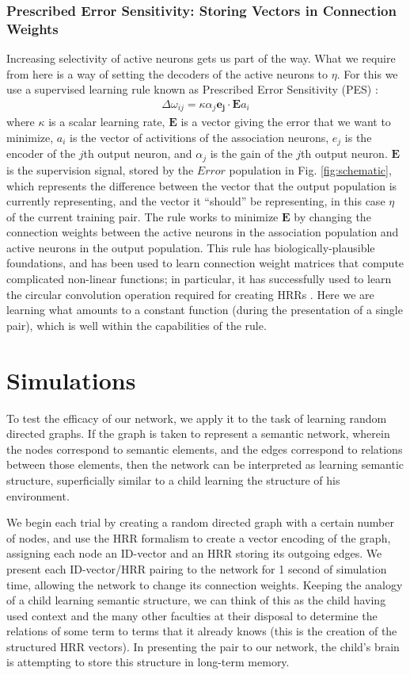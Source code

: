 \documentclass[10pt,letterpaper]{article}
\begin{document}
\subsubsection{Prescribed Error Sensitivity: Storing Vectors in Connection Weights}
Increasing selectivity of active neurons gets us part of the way. What we require from here is a way of setting the decoders of the active neurons to $\eta$. For this we use a supervised learning rule known as Prescribed Error Sensitivity (PES) \citep{MacNeil2011a}:
\begin{align}
\Delta \omega_{ij} = \kappa \alpha_j \mathbf{e_j} \cdot \mathbf{E}a_i
\end{align}
where $\kappa$ is a scalar learning rate, $\mathbf{E}$ is a vector giving the error that we want to minimize, $a_i$ is the vector of activitions of the association neurons, $e_j$ is the encoder of the $j$th output neuron, and $\alpha_j$ is the gain of the $j$th output neuron. $\mathbf{E}$ is the supervision signal, stored by the $Error$ population in Fig. \ref{fig:schematic}, which represents the difference between the vector that the output population is currently representing, and the vector it ``should'' be representing, in this case $\eta$ of the current training pair. The rule works to minimize $\mathbf{E}$ by changing the connection weights between the active neurons in the association population and active neurons in the output population. This rule has biologically-plausible foundations, and has been used to learn connection weight matrices that compute complicated non-linear functions; in particular, it has successfully used to learn the circular convolution operation required for creating HRRs \citep{Stewart2011a}. Here we are learning what amounts to a constant function (during the presentation of a single pair), which is well within the capabilities of the rule.

\section{Simulations}
To test the efficacy of our network, we apply it to the task of learning random directed graphs. If the graph is taken to represent a semantic network, wherein the nodes correspond to semantic elements, and the edges correspond to relations between those elements, then the network can be interpreted as learning semantic structure, superficially similar to a child learning the structure of his environment.

We begin each trial by creating a random directed graph with a certain number of nodes, and use the HRR formalism to create a vector encoding of the graph, assigning each node an ID-vector and an HRR storing its outgoing edges. We present each ID-vector/HRR pairing to the network for 1 second of simulation time, allowing the network to change its connection weights. Keeping the analogy of a child learning semantic structure, we can think of this as the child having used context and the many other faculties at their disposal to determine the relations of some term to terms that it already knows (this is the creation of the structured HRR vectors). In presenting the pair to our network, the child's brain is attempting to store this structure in long-term memory.
\end{document}
